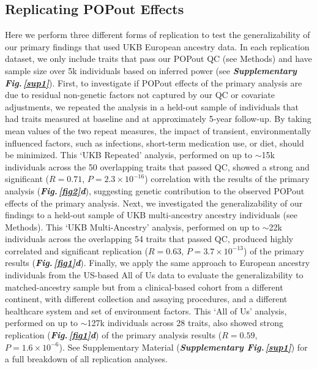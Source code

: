 \documentclass[12pt]{zHenriquesLab-StyleBioRxiv}
\newcommand\dref[2]{\normalsize{\textbf{\textit{Fig.\,\ref{#1}#2}}}\normalsize{}}
\newcommand\sref[1]{\normalsize{\textbf{\textit{Supplementary Fig.\,\ref{#1}}}}\normalsize{}}
\begin{document}
\subsection*{Replicating POPout Effects} \label{sec:res1}
Here we perform three different forms of replication to test the generalizability of our primary 
findings that used UKB European ancestry data. In each replication dataset, 
we only include traits that pass our POPout QC (see Methods) and have sample size 
over 5k individuals based on inferred power (see \sref{sup1}). First, 
to investigate if POPout effects of the primary analysis are due to residual 
non-genetic factors not captured by our QC or covariate adjustments, we repeated 
the analysis in a held-out sample of individuals that had traits measured at 
baseline and at approximately 5-year follow-up. By taking mean values of the 
two repeat measures, the impact of transient, environmentally influenced factors, 
such as infections, short-term medication use, or diet, should be minimized. 
This ‘UKB Repeated’ analysis, performed on up to $\sim$15k individuals across the 
50 overlapping traits that passed QC, showed a strong and 
significant ($R=0.71$, $P=2.3 \times 10^{-16}$) correlation with the results 
of the primary analysis (\dref{fig2}{d}), suggesting genetic contribution to the 
observed POPout effects of the primary analysis. Next, we investigated the generalizability 
of our findings to a held-out sample of UKB multi-ancestry ancestry individuals (see Methods). 
This ‘UKB Multi-Ancestry’ analysis, performed on up to $\sim$22k individuals across the 
overlapping 54 traits that passed QC, produced highly correlated and significant 
replication ($R=0.63$, $P=3.7 \times 10^{-13}$) of the primary results (\dref{fig1}{d}). 
Finally, we apply the same approach to European ancestry individuals from the 
US-based All of Us data \cite{Bick2024} to evaluate the generalizability to matched-ancestry 
sample but from a clinical-based cohort from a different continent, with different 
collection and assaying procedures, and a different healthcare system and set of 
environment factors. This ‘All of Us’ analysis, performed on up to $\sim$127k individuals 
across 28 traits, also showed strong replication (\dref{fig1}{d}) of the primary 
analysis results ($R=0.59$, $P=1.6 \times 10^{-6}$). 
See Supplementary Material (\sref{sup1}) for a full breakdown of all replication analyses. 
%
%
\end{document}
